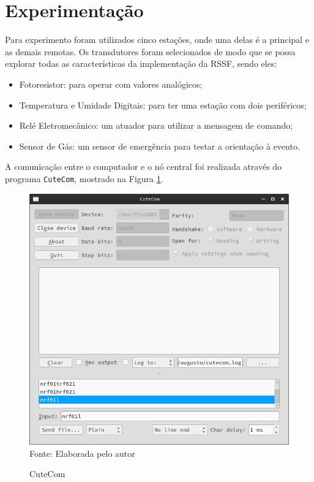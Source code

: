 {\section{Experimentação}
Para experimento foram utilizados cinco estações, onde uma delas é a principal e as demais remotas. Os
transdutores foram selecionados de modo que se possa explorar todas as características da implementação da
RSSF, sendo eles:

\begin{itemize}
	\item Fotoresistor: para operar com valores analógicos;
	\item Temperatura e Umidade Digitais: para ter uma estação com dois periféricos;
	\item Relé Eletromecânico: um atuador para utilizar a mensagem de comando;
	\item Sensor de Gás: um sensor de emergência para testar a orientação à evento.
\end{itemize}

A comunicação entre o computador e o nó central foi realizada através do programa \texttt{CuteCom}, mostrado na Figura
\ref{figura:cutecom}.

\begin{figure}[h!]
	\caption{CuteCom}
	\centering
	\includegraphics[scale=0.5]{../images/cutecom.png}
	\hspace{\linewidth}
	Fonte: Elaborada pelo autor
	\label{figura:cutecom}
\end{figure}

}
